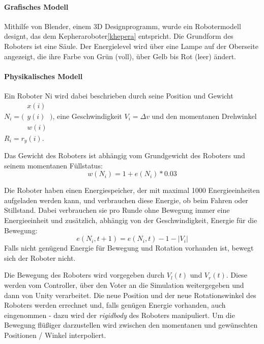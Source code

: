 \paragraph{Grafisches Modell} Mithilfe von Blender, einem 3D Designprogramm, wurde ein Robotermodell designt, das dem Kepheraroboter\ref{khepera} entspricht. Die Grundform des Roboters ist
eine S{\"{a}}ule.
Der Energielevel wird {\"{u}}ber eine Lampe auf der Oberseite angezeigt, die ihre
Farbe von Gr{\"{u}}n (voll), {\"{u}}ber Gelb bis Rot (leer) {\"{a}}ndert.


\paragraph{Physikalisches Modell}
Ein Roboter \gls{Ni} wird dabei beschrieben durch seine Position und Gewicht
$ N_i = \bigl(\begin{smallmatrix} x(i) \\ y(i) \\ w(i) \end{smallmatrix}\bigr)$, eine
Geschwindigkeit $ V_i = \Delta v $ und den momentanen Drehwinkel
$ R_i = r_y(i)$. 

Das Gewicht des Roboters ist abh{\"{a}}ngig vom Grundgewicht des Roboters und seinem momentanen F{\"{u}}llstatus: 
\begin{equation}
    \label{eq:w}
 w(N_i) = 1 + e(N_i) * 0.03
\end{equation}

Die Roboter haben einen Energiespeicher, der mit maximal 1000 Energieeinheiten
aufgeladen werden kann, und verbrauchen diese Energie, ob beim Fahren oder
Stillstand. Dabei verbrauchen sie pro Runde ohne Bewegung immer eine Energieeinheit und zus{\"{a}}tzlich, abh{\"{a}}ngig von der Geschwindigkeit, Energie f{\"{u}}r die Bewegung:
\begin{equation}
    \label{eq:entladen}
	e(N_i, t + 1) = e(N_i, t) - 1 - |V_i|
\end{equation}
Falls nicht gen{\"{u}}gend Energie f{\"{u}}r Bewegung und Rotation vorhanden ist, bewegt sich der Roboter nicht.

Die Bewegung des Roboters wird vorgegeben durch $V_l(t)$ und $ V_r(t)$. Diese werden vom Controller, {\"{u}}ber den Voter an die Simulation weitergegeben und dann von Unity verarbeitet.
Die neue Position und der neue Rotationswinkel des Roboters werden errechnet und, falls gen{\"{u}}gen Energie
vorhanden, auch eingenommen - dazu wird der \textit{rigidbody} des Roboters manipuliert.
Um die Bewegung fl{\"{u}}{\ss}iger darzustellen wird zwischen den momentanen und gew{\"{u}}nschten Positionen / Winkel interpoliert.

